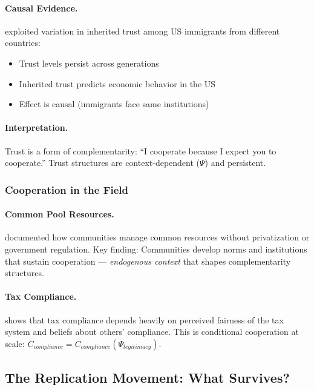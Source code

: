 \paragraph{Causal Evidence.}
\citet{alganandcahuc2010} exploited variation in inherited trust among
US immigrants from different countries:
\begin{itemize}
  \item Trust levels persist across generations
  \item Inherited trust predicts economic behavior in the US
  \item Effect is causal (immigrants face same institutions)
\end{itemize}

\paragraph{Interpretation.}
Trust is a form of complementarity: ``I cooperate because I expect you to cooperate.''
Trust structures are context-dependent ($\Psi$) and persistent.

\subsubsection{Cooperation in the Field}

\paragraph{Common Pool Resources.}
\citet{ostrom1990} documented how communities manage common resources
without privatization or government regulation.
Key finding: Communities develop norms and institutions that sustain cooperation \citep{axelrod1984evolution}---
\emph{endogenous context} that shapes complementarity structures.

\paragraph{Tax Compliance.}
\citet{slemrod} shows that tax compliance depends heavily on
perceived fairness of the tax system and beliefs about others' compliance.
This is conditional cooperation at scale: $C_{compliance} = C_{compliance}(\Psi_{legitimacy})$.

\subsection{The Replication Movement: What Survives?}

